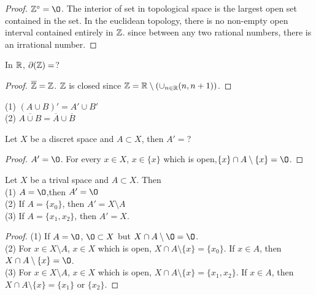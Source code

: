\begin{proof}
    $\Z^{\circ}=\O$.
    The interior of set in topological space 
    is the largest open set contained in the set. 
    In the euclidean topology, 
    there is no non-empty open interval contained entirely in $\mathbb{Z}$.
    since between any two rational numbers, there is an irrational number.
\end{proof}

\begin{exercise}{}{}
    In $\mathbb{R}$, $\partial(\mathbb{Z})=$?
\end{exercise}

\begin{proof}
    $\overline{\mathbb{Z}}=\mathbb{Z}$. $\mathbb{Z}$ is closed since $\mathbb{Z}=\mathbb{R}\setminus(\cup_{n\in \mathbb{R}}(n,n+1))$.
\end{proof}

\begin{exercise}{}{}
    (1) $(A\cup B)'=A'\cup B'$\\
    (2) $\overline{A\cup B}=\overline{A}\cup \overline{B}$
\end{exercise}

\begin{exercise}{}{}
    Let $X$ be a discret space and $A\subset X$, then $A'=$?
\end{exercise}
\begin{proof}
    $A'=\O$. For every $x\in X$, $x\in \{x\}$ which is open,$\{x\}\cap A\setminus\{x\}=\O$.
\end{proof}

\begin{exercise}{}{}
    Let $X$ be a trival space and $A\subset X$. Then\\
    (1) $A=\O$,then $A'=\O$\\
    (2) If $A=\{x_0\}$, then $A'=X\setminus A$\\
    (3) If $A=\{x_1,x_2\}$, then $A'=X$.
\end{exercise}

\begin{proof}
    (1) If $A=\O$, $\O\subset X$ but $X\cap A\setminus \O=\O$.\\
    (2) For $x\in X\setminus A$, $x\in X$ which is open, $X\cap A\setminus\{x\}=\{x_0\}$.
    If $x\in A$, then $X\cap A\setminus \{x\}=\O$.\\
    (3) For $x\in X\setminus A$, $x\in X$ which is open, $X\cap A\setminus\{x\}=\{x_1,x_2\}$.
    If $x\in A$, then $X\cap A\setminus \{x\}=\{x_1\}$ or $\{x_2\}$.
\end{proof}

